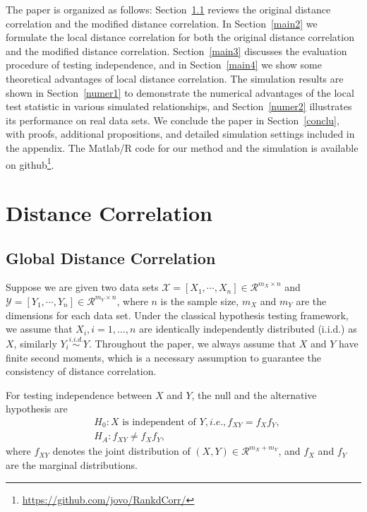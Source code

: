 \documentclass[12pt]{article}
\begin{document}
The paper is organized as follows: Section~\ref{main1} reviews the original distance correlation and the modified distance correlation. In Section~\ref{main2} we formulate the local distance correlation for both the original distance correlation and the modified distance correlation. Section~\ref{main3} discusses the evaluation procedure of testing independence, and in Section~\ref{main4} we show some theoretical advantages of local distance correlation. The simulation results are shown in Section~\ref{numer1} to demonstrate the numerical advantages of the local test statistic in various simulated relationships, and Section~\ref{numer2} illustrates its performance on real data sets. We conclude the paper in Section~\ref{conclu}, with proofs, additional propositions, and detailed simulation settings included in the appendix. The Matlab/R code for our method and the simulation is available on github\footnote{\url{https://github.com/jovo/RankdCorr/}}. 

\section{Distance Correlation}
\label{main}
\subsection{Global Distance Correlation}
\label{main1}
Suppose we are given two data sets $\mathcal{X}=[X_{1},\cdots, X_{n}] \in \mathcal{R}^{m_{X} \times n}$ and $\mathcal{Y}=[Y_{1},\cdots, Y_{n}] \in \mathcal{R}^{m_{Y} \times n}$, where $n$ is the sample size, $m_{X}$ and $m_{Y}$ are the dimensions for each data set. Under the classical hypothesis testing framework, we assume that $X_{i}, i=1,\ldots,n$ are identically independently distributed (i.i.d.) as $X$, similarly $Y_{i} \stackrel{i.i.d.}{\sim} Y$. Throughout the paper, we always assume that $X$ and $Y$ have finite second moments, which is a necessary assumption to guarantee the consistency of distance correlation.

For testing independence between $X$ and $Y$, the null and the alternative hypothesis are
\begin{align*}
& H_{0}: X \mbox{ is independent of } Y, i.e., f_{XY}=f_{X}f_{Y},\\
& H_{A}: f_{XY} \neq f_{X}f_{Y},
\end{align*}
where $f_{XY}$ denotes the joint distribution of $(X,Y) \in \mathcal{R}^{m_{X}+m_{Y}}$, and $f_{X}$ and $f_{Y}$ are the marginal distributions. 
\end{document}
